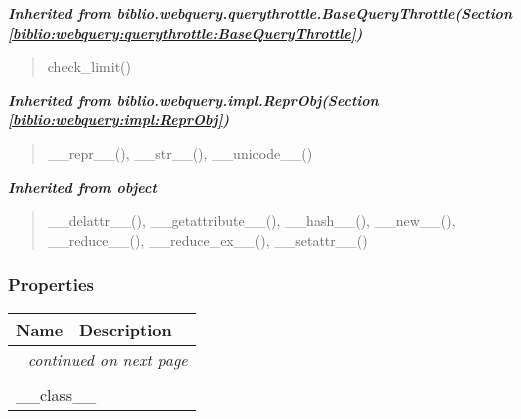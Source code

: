 \large{\textbf{\textit{Inherited from biblio.webquery.querythrottle.BaseQueryThrottle\textit{(Section \ref{biblio:webquery:querythrottle:BaseQueryThrottle})}}}}

\begin{quote}
check\_limit()
\end{quote}

\large{\textbf{\textit{Inherited from biblio.webquery.impl.ReprObj\textit{(Section \ref{biblio:webquery:impl:ReprObj})}}}}

\begin{quote}
\_\_repr\_\_(), \_\_str\_\_(), \_\_unicode\_\_()
\end{quote}

\large{\textbf{\textit{Inherited from object}}}

\begin{quote}
\_\_delattr\_\_(), \_\_getattribute\_\_(), \_\_hash\_\_(), \_\_new\_\_(), \_\_reduce\_\_(), \_\_reduce\_ex\_\_(), \_\_setattr\_\_()
\end{quote}


  \subsubsection{Properties}

    \vspace{-1cm}
\hspace{\varindent}\begin{longtable}{|p{\varnamewidth}|p{\vardescrwidth}|l}
\cline{1-2}
\cline{1-2} \centering \textbf{Name} & \centering \textbf{Description}& \\
\cline{1-2}
\endhead\cline{1-2}\multicolumn{3}{r}{\small\textit{continued on next page}}\\\endfoot\cline{1-2}
\endlastfoot\multicolumn{2}{|l|}{\textit{Inherited from object}}\\
\multicolumn{2}{|p{\varwidth}|}{\raggedright \_\_class\_\_}\\
\cline{1-2}
\end{longtable}


